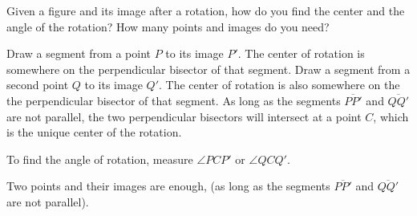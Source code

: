 \documentclass[nooutcomes]{ximera}
\begin{document}
\begin{question}
Given a figure and its image after a rotation, how do you find the center and the angle of the rotation?  How many points and images do you need?  
\begin{freeResponse}
\begin{hint}
Draw a segment from a point $P$ to its image $P'$.  The center of rotation is somewhere on the perpendicular bisector of that segment.  Draw a segment from a second point $Q$ to its image $Q'$.  The center of rotation is also somewhere on the the perpendicular bisector of that segment.  As long as the segments $\overline{PP'}$ and $\overline{QQ'}$ are not parallel, the two perpendicular bisectors will intersect at a point $C$, which is the unique center of the rotation.  

To find the angle of rotation, measure $\angle PCP'$ or $\angle QCQ'$.

Two points and their images are enough, (as long as the segments $\overline{PP'}$ and $\overline{QQ'}$ are not parallel). 
\end{hint}
\end{freeResponse}
\end{question}
\end{document}
